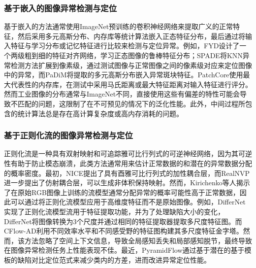 \documentclass[lang=chs, degree=master, blindreview=false, adobe=false]{yanputhesis}
\begin{document}
\subsubsection{基于嵌入的图像异常检测与定位}
基于嵌入的方法通常使用ImageNet\cite{deng2009imagenet}预训练的卷积神经网络来提取广义的正常特征，然后采用多元高斯分布\cite{defard2021padim}、内存库\cite{roth2022towards, gong2019memorizing, hou2021divide, yang2020improving}等统计算法嵌入正态特征分布，最后通过将输入特征与学习分布或记忆特征进行比较来检测与定位异常。例如，FYD\cite{zheng2022focus}设计了一个两级粗到细的特征对齐网络，学习正态图像的鲁棒特征分布；SPADE\cite{cohen2005sub}将KNN异常检测方法扩展到像素级，通过测试图像与正常图像之间的像素级对应来定位图像中的异常，而PaDiM\cite{defard2021padim}将提取的多元高斯分布嵌入异常斑块特征。PatchCore\cite{roth2022towards}使用最大代表性的内存库，在测试中采用马氏距离或最大特征距离对输入特征进行评分。然而工业图像的分布通常与ImageNet不同，直接使用这些有偏差的特性可能会导致不匹配的问题，这限制了在不可预见的情况下的泛化性能。此外，中间过程所包含的统计算法总是存在高计算复杂度或高内存消耗的问题。

\subsubsection{基于正则化流的图像异常检测与定位}
正则化流\cite{rezende2015variational}是一种具有双射映射和可追踪雅可比行列式的可逆神经网络，因为其可逆性有助于防止模态崩溃，此类方法通常用来估计正常数据的和潜在的异常数据分配的概率密度\cite{serra2019input}。最初，NICE\cite{dinh2014nice}提出了具有酉雅可比行列式的加性耦合层，而RealNVP\cite{dinh2016density}进一步提出了仿射耦合层，可以生成非体积保持映射。然而，Kirichenko等人\cite{kirichenko2020normalizing}揭示了在原始RGB图像上训练的流模型通常分配异常的概率可能性高于正常数据，因此可以通过将正则化流模型应用于高维度特征而不是原始图像。例如，DifferNet\cite{rudolph2021same}实现了正则化流模型流用于特征提取功能，并为了处理缺陷大小的变化，DifferNet将图像转换为3个尺度并通过相同的特征提取器提取多尺度特征图。而CFlow-AD\cite{gudovskiy2022cflow}利用不同效率水平和不同感受野的特征图构建其多尺度特征金字塔。然而，该方法忽略了空间上下文信息，导致全局感知丢失和局部感知脱节，最终导致在图像异常检测任务上性能表现不佳。最近，PyramidFlow\cite{lei2023pyramidflow}通过基于潜在的基于模板的缺陷对比定位范式来减少类内的方差，进而改进异常定位性能。
\end{document}
